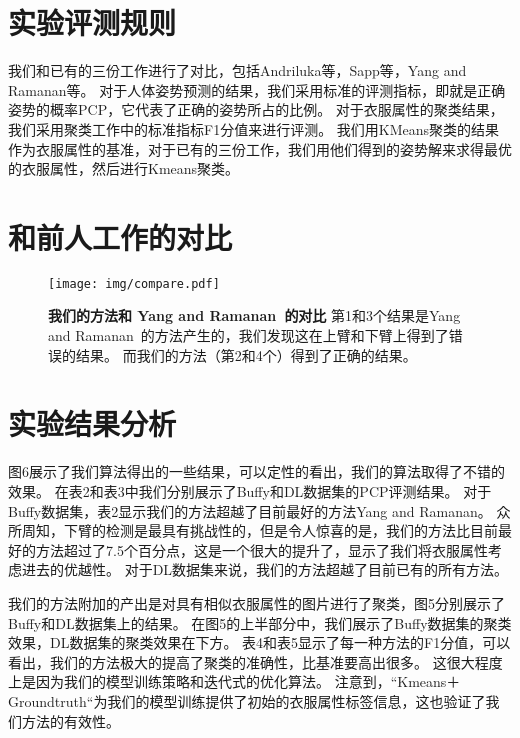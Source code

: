 \section{实验评测规则}
我们和已有的三份工作进行了对比，包括Andriluka等\cite{cvpr09}，Sapp等\cite{eccv10}，Yang and Ramanan等\cite{deva11}。
对于人体姿势预测的结果，我们采用标准的评测指标，即就是正确姿势的概率PCP\cite{fer09}，它代表了正确的姿势所占的比例。
对于衣服属性的聚类结果，我们采用聚类工作中的标准指标F1分值来进行评测。
我们用KMeans聚类的结果作为衣服属性的基准，对于已有的三份工作，我们用他们得到的姿势解来求得最优的衣服属性，然后进行Kmeans聚类。

\section{和前人工作的对比}

\begin{figure}[tbp]
\centering
\texttt{[image: img/compare.pdf]}
\caption{ \textbf{我们的方法和 Yang and Ramanan~\cite{deva11}的对比 }
第1和3个结果是Yang and Ramanan~\cite{deva11}的方法产生的，我们发现这在上臂和下臂上得到了错误的结果。
而我们的方法（第2和4个）得到了正确的结果。}
\label{fig:compare}
\end{figure}

\section{实验结果分析}
图6展示了我们算法得出的一些结果，可以定性的看出，我们的算法取得了不错的效果。
在表2和表3中我们分别展示了Buffy和DL数据集的PCP评测结果。
对于Buffy数据集，表2显示我们的方法超越了目前最好的方法Yang and Ramanan\cite{deva11}。
众所周知，下臂的检测是最具有挑战性的，但是令人惊喜的是，我们的方法比目前最好的方法超过了7.5个百分点，这是一个很大的提升了，显示了我们将衣服属性考虑进去的优越性。
对于DL数据集来说，我们的方法超越了目前已有的所有方法。

我们的方法附加的产出是对具有相似衣服属性的图片进行了聚类，图5分别展示了Buffy和DL数据集上的结果。
在图5的上半部分中，我们展示了Buffy数据集的聚类效果，DL数据集的聚类效果在下方。
表4和表5显示了每一种方法的F1分值，可以看出，我们的方法极大的提高了聚类的准确性，比基准要高出很多。
这很大程度上是因为我们的模型训练策略和迭代式的优化算法。
注意到，“Kmeans＋Groundtruth“为我们的模型训练提供了初始的衣服属性标签信息，这也验证了我们方法的有效性。

